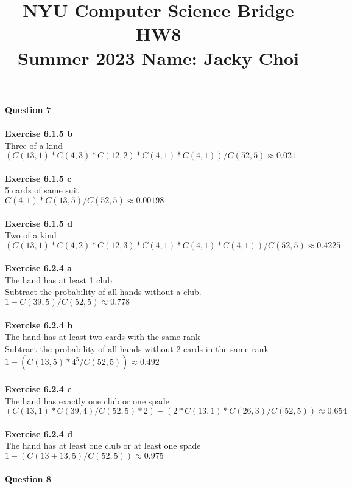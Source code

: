 \documentclass{article}
\title{\textbf{NYU Computer Science Bridge HW8}\\
Summer 2023 Name: Jacky Choi}
\date{}
\begin{document}
\setul{}{2pt}
\maketitle

\noindent \textbf{Question 7}\\\\
\textbf{Exercise 6.1.5 b}\\
Three of a kind\\
$(C(13,1) * C(4,3) * C(12,2) * C(4,1) * C(4,1)) / C(52,5) \approx 0.021$\\\\
\textbf{Exercise 6.1.5 c}\\
5 cards of same suit\\
$C(4,1) * C(13,5) / C(52,5) \approx 0.00198$\\\\
\textbf{Exercise 6.1.5 d}\\
Two of a kind\\
$(C(13,1) * C(4,2) * C(12,3) * C(4,1) * C(4,1) * C(4,1)) / C(52,5) \approx 0.4225$\\\\
\textbf{Exercise 6.2.4 a}\\
The hand has at least 1 club\\
Subtract the probability of all hands without a club.\\
$1 - C(39,5) / C(52,5) \approx 0.778$\\\\
\textbf{Exercise 6.2.4 b}\\
The hand has at least two cards with the same rank\\
Subtract the probability of all hands without 2 cards in the same rank\\
$1 - (C(13,5) * 4^5 / C(52,5)) \approx 0.492$\\\\
\textbf{Exercise 6.2.4 c}\\
The hand has exactly one club or one spade\\
$(C(13,1)*C(39,4)/C(52,5) * 2) - (2*C(13,1)*C(26,3)/C(52,5)) \approx 0.654$\\\\
\textbf{Exercise 6.2.4 d}\\
The hand has at least one club or at least one spade\\
$1 - (C(13+13,5)/C(52,5)) \approx 0.975$\\\\
\newpage
\noindent \textbf{Question 8}\\\\
\end{document}
